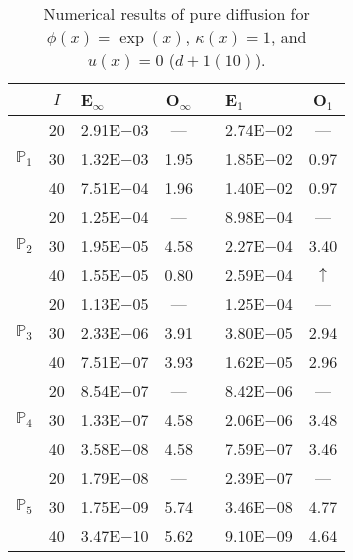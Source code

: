 \begin{table}[H]
\centering
\caption{Numerical results of pure diffusion for $\phi(x)=\exp(x)$, $\kappa(x)=1$, and $u(x)=0$ ($d+1(10)$).}
\begin{tabular}{@{}l c l c c l c@{}}
\toprule
 & $I$ & E$_{\infty}$ & O$_{\infty}$ && E$_1$ & O$_1$\\
\midrule
\multirow{3}{*}{$\mathbb{P}_{1}$}
 & 20 & 2.91E$-$03 & --- && 2.74E$-$02 & ---\\
 & 30 & 1.32E$-$03 & 1.95 && 1.85E$-$02 & 0.97\\
 & 40 & 7.51E$-$04 & 1.96 && 1.40E$-$02 & 0.97\\
\midrule
\multirow{3}{*}{$\mathbb{P}_{2}$}
 & 20 & 1.25E$-$04 & --- && 8.98E$-$04 & ---\\
 & 30 & 1.95E$-$05 & 4.58 && 2.27E$-$04 & 3.40\\
 & 40 & 1.55E$-$05 & 0.80 && 2.59E$-$04 & $\uparrow$\\
\midrule
\multirow{3}{*}{$\mathbb{P}_{3}$}
 & 20 & 1.13E$-$05 & --- && 1.25E$-$04 & ---\\
 & 30 & 2.33E$-$06 & 3.91 && 3.80E$-$05 & 2.94\\
 & 40 & 7.51E$-$07 & 3.93 && 1.62E$-$05 & 2.96\\
\midrule
\multirow{3}{*}{$\mathbb{P}_{4}$}
 & 20 & 8.54E$-$07 & --- && 8.42E$-$06 & ---\\
 & 30 & 1.33E$-$07 & 4.58 && 2.06E$-$06 & 3.48\\
 & 40 & 3.58E$-$08 & 4.58 && 7.59E$-$07 & 3.46\\
\midrule
\multirow{3}{*}{$\mathbb{P}_{5}$}
 & 20 & 1.79E$-$08 & --- && 2.39E$-$07 & ---\\
 & 30 & 1.75E$-$09 & 5.74 && 3.46E$-$08 & 4.77\\
 & 40 & 3.47E$-$10 & 5.62 && 9.10E$-$09 & 4.64\\
\bottomrule
\end{tabular}
\end{table}